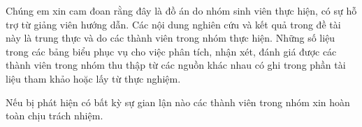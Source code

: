 
Chúng em xin cam đoan rằng đây là đồ án do nhóm sinh viên thực hiện, có sự hỗ trợ từ giảng viên hướng dẫn. Các nội dung nghiên cứu và kết quả trong đề tài này là trung thực và do các thành viên trong nhóm thực hiện. Những số liệu trong các bảng biểu phục vụ cho việc phân tích, nhận xét, đánh giá được các thành viên trong nhóm thu thập từ các nguồn khác nhau có ghi trong phần tài liệu tham khảo hoặc lấy từ thực nghiệm.

Nếu bị phát hiện có bất kỳ sự gian lận nào các thành viên trong nhóm xin hoàn toàn chịu trách nhiệm.

\ChuKyNhom
\clearpage